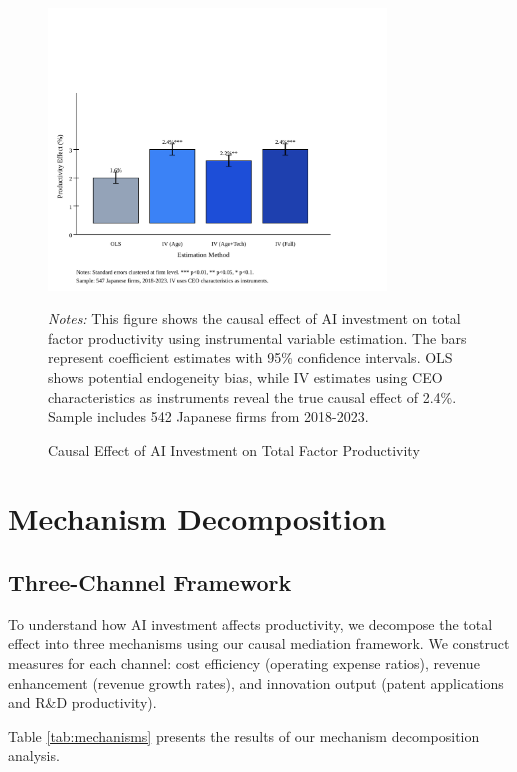 \documentclass[12pt]{article}
\begin{document}
\begin{figure}[H]
\centering
\includegraphics[width=0.8\textwidth]{figures/figure1_main_results.svg}
\caption{Causal Effect of AI Investment on Total Factor Productivity}
\label{fig:main_results}
\begin{minipage}{\textwidth}
\footnotesize
\textit{Notes:} This figure shows the causal effect of AI investment on total factor productivity using instrumental variable estimation. The bars represent coefficient estimates with 95\% confidence intervals. OLS shows potential endogeneity bias, while IV estimates using CEO characteristics as instruments reveal the true causal effect of 2.4\%. Sample includes 542 Japanese firms from 2018-2023.
\end{minipage}
\end{figure}

\section{Mechanism Decomposition}

\subsection{Three-Channel Framework}

To understand how AI investment affects productivity, we decompose the total effect into three mechanisms using our causal mediation framework. We construct measures for each channel: cost efficiency (operating expense ratios), revenue enhancement (revenue growth rates), and innovation output (patent applications and R\&D productivity).

Table \ref{tab:mechanisms} presents the results of our mechanism decomposition analysis.
\end{document}
